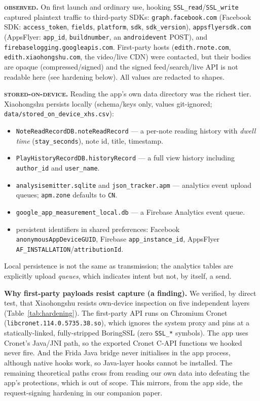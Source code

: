\documentclass[conference,10pt]{IEEEtran}
\newcommand{\code}[1]{\texttt{\small #1}}
\newcommand{\observed}{\textsc{observed}}
\newcommand{\stored}{\textsc{stored-on-device}}
\begin{document}
\textbf{\observed{}.} On first launch and ordinary use, hooking \code{SSL\_read}/\code{SSL\_write} captured plaintext traffic to third-party SDKs: \code{graph.facebook.com} (Facebook SDK: \code{access\_token}, \code{fields}, \code{platform}, \code{sdk}, \code{sdk\_version}), \code{appsflyersdk.com} (AppsFlyer: \code{app\_id}, \code{buildnumber}, an \code{androidevent} POST), and \code{firebaselogging.googleapis.com}. First-party hosts (\code{edith.rnote.com}, \code{edith.xiaohongshu.com}, the video/live CDN) were contacted, but their bodies are opaque (compressed/signed) and the signed feed/search/live API is not readable here (see hardening below). All values are redacted to shapes.

\textbf{\stored{}.} Reading the app's own data directory was the richest tier. Xiaohongshu persists locally (schema/keys only, values git-ignored; \code{data/stored\_on\_device\_xhs.csv}):
\begin{itemize}
  \item \code{NoteReadRecordDB.noteReadRecord} --- a per-note reading history with \emph{dwell time} (\code{stay\_seconds}), note id, title, timestamp.
  \item \code{PlayHistoryRecordDB.historyRecord} --- a full view history including \code{author\_id} and \code{user\_name}.
  \item \code{analysisemitter.sqlite} and \code{json\_tracker.apm} --- analytics event upload queues; \code{apm.zone} defaults to \code{CN}.
  \item \code{google\_app\_measurement\_local.db} --- a Firebase Analytics event queue.
  \item persistent identifiers in shared preferences: Facebook \code{anonymousAppDeviceGUID}, Firebase \code{app\_instance\_id}, AppsFlyer \code{AF\_INSTALLATION}/\code{attributionId}.
\end{itemize}
Local persistence is not the same as transmission; the analytics tables are explicitly upload \emph{queues}, which indicates intent but not, by itself, a send.

\textbf{Why first-party payloads resist capture (a finding).} We verified, by direct test, that Xiaohongshu resists own-device inspection on five independent layers (Table~\ref{tab:hardening}). The first-party API runs on Chromium Cronet (\code{libcronet.114.0.5735.38.so}), which ignores the system proxy and pins at a statically-linked, fully-stripped BoringSSL (zero \code{SSL\_*} symbols). The app uses Cronet's Java/JNI path, so the exported Cronet C-API functions we hooked never fire. And the Frida Java bridge never initialises in the app process, although native hooks work, so Java-layer hooks cannot be installed. The remaining theoretical paths cross from reading our own data into defeating the app's protections, which is out of scope. This mirrors, from the app side, the request-signing hardening in our companion paper.
\end{document}
